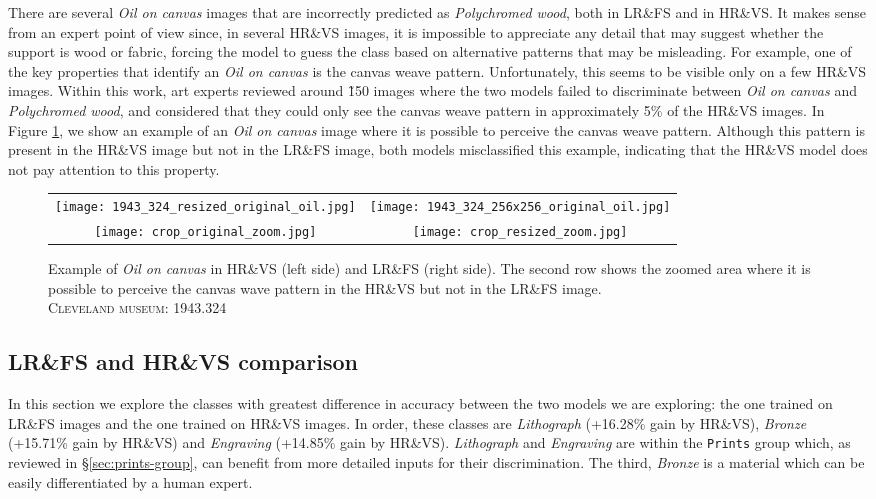 \documentclass{article}
\begin{document}
There are several \textit{Oil on canvas} images that are incorrectly predicted as \textit{Polychromed wood}, both in LR\&FS and in HR\&VS. It makes sense from an expert point of view since, in several HR\&VS images, it is impossible to appreciate any detail that may suggest whether the support is wood or fabric, forcing the model to guess the class based on alternative patterns that may be misleading. For example, one of the key properties that identify an \textit{Oil on canvas} is the canvas weave pattern. Unfortunately, this seems to be visible only on a few HR\&VS images. Within this work, art experts reviewed around \~150 images where the two models failed to discriminate between \textit{Oil on canvas} and \textit{Polychromed wood}, and considered that they could only see the canvas weave pattern in approximately 5\% of the HR\&VS images. In Figure \ref{fig:polychromed-oil}, we show an example of an \textit{Oil on canvas} image where it is possible to perceive the canvas weave pattern. Although this pattern is present in the HR\&VS image but not in the LR\&FS image, both models misclassified this example, indicating that the HR\&VS model does not pay attention to this property.

\begin{figure}[t]
    \centering
    \begin{tabular}{cc}
        \texttt{[image: 1943\_324\_resized\_original\_oil.jpg]} &
        \texttt{[image: 1943\_324\_256x256\_original\_oil.jpg]}\\
        \texttt{[image: crop\_original\_zoom.jpg]} &
        \texttt{[image: crop\_resized\_zoom.jpg]}\\
    \end{tabular}
    \caption{Example of \textit{Oil on canvas} in HR\&VS (left side) and LR\&FS (right side). The second row shows the zoomed area where it is possible to perceive the canvas wave pattern in the HR\&VS but not in the LR\&FS image.\\
    \small{\textsc{Cleveland museum: 1943.324}}}
    \label{fig:polychromed-oil}
\end{figure}


\subsection{LR\&FS and HR\&VS comparison} \label{sec:exp_cri}

In this section we explore the classes with greatest difference in accuracy between the two models we are exploring: the one trained on LR\&FS images and the one trained on HR\&VS images. In order, these classes are \textit{Lithograph} (+16.28\% gain by HR\&VS), \textit{Bronze} (+15.71\% gain by HR\&VS) and \textit{Engraving} (+14.85\% gain by HR\&VS). \textit{Lithograph} and \textit{Engraving} are within the \texttt{Prints} group which, as reviewed in \S\ref{sec:prints-group}, can benefit from more detailed inputs for their discrimination. The third, \textit{Bronze} is a material which can be easily differentiated by a human expert.
\end{document}
